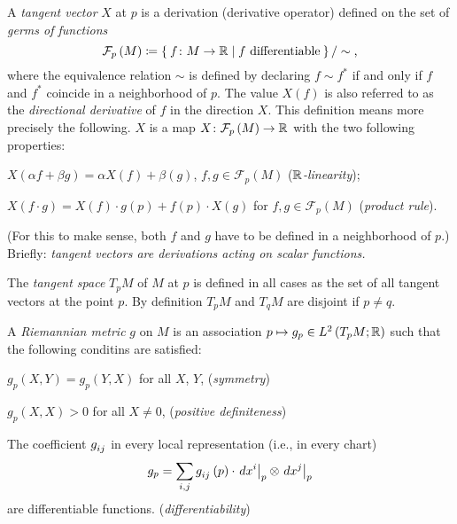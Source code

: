 \documentclass[../main.tex]{subfiles}
\begin{document}
\begin{definition}\label{Manifold:TangentVector}
A \textit{tangent vector} $X$ at $p$
is a derivation (derivative operator) defined on the set of \textit{germs of functions}
$$\mathcal{F}_p\left(M\right)\coloneqq\Set{f\colon M\to\mathbb{R}|f\text{ differentiable}}/\sim\text{,}$$
where the equivalence relation $\sim$ is defined by
declaring $f\sim f^\ast$ if and only if
$f$ and $f^\ast$ coincide in a neighborhood of $p$.
The value $X\left(f\right)$ is also referred to as the \textit{directional derivative} of $f$ in the direction $X$.
This definition means more precisely the following.
$X$ is a map $X\colon\mathcal{F}_p\left(M\right)\to\mathbb{R}$
with the two following properties:
\begin{APAenumerate}
\item $X\left(\alpha f+\beta g\right)=\alpha X\left(f\right)+\beta\left(g\right)$, $f,g\in\mathcal{F}_p\left(M\right)$ (\textit{$\mathbb{R}$-linearity});
\item $X\left(f\cdot g\right)=X\left(f\right)\cdot g\left(p\right)+f\left(p\right)\cdot X\left(g\right)$ for $f,g\in\mathcal{F}_p\left(M\right)$ (\textit{product rule}).
\end{APAenumerate}
(For this to make sense, both $f$ and $g$ have to be defined in a neighborhood of $p$.)
Briefly: \textit{tangent vectors are derivations acting on scalar functions.}
\end{definition}
\begin{corollary}\label{Manifold:TangentSpace}
The \textit{tangent space} $T_pM$ of $M$ at $p$
is defined in all cases as
the set of all tangent vectors at the point $p$.
By definition $T_pM$ and $T_qM$ are disjoint if $p\ne q$.
\end{corollary}
\begin{definition}\label{Manifold:RiemannianMetric}
A \textit{Riemannian metric} $g$ on $M$
is an association $p\mapsto g_p\in L^2\left(T_pM;\mathbb{R}\right)$
such that the following conditins are satisfied:
\begin{APAenumerate}
\item $g_p\left(X,Y\right)=g_p\left(Y,X\right)$ for all $X$, $Y$, \hfill (\textit{symmetry})
\item $g_p\left(X,X\right)>0$ for all $X\ne0$, \hfill (\textit{positive definiteness})
\item The coefficient $\tensor{g}{_i_j}$ in every local representation (i.e., in every chart) $$g_p=\sum_{i,j}\tensor{g}{_i_j}\left(p\right)\cdot \left.d\tensor{x}{^i}\right|_p \otimes\left.d\tensor{x}{^j}\right|_p$$ are differentiable functions. \hfill (\textit{differentiability})
\end{APAenumerate}
\end{definition}
\end{document}
